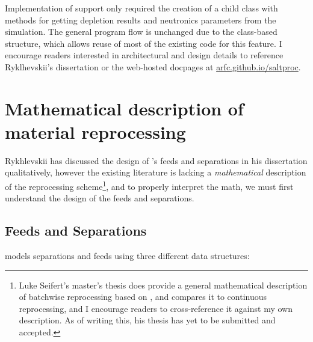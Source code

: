 Implementation of \OpenMC support only required the creation of a child class
with methods for getting depletion results and neutronics parameters from the
\OpenMC simulation. The general program flow is unchanged due to the
class-based structure, which allows reuse of most of the existing code for
this feature. I encourage readers interested in architectural and design
details to reference Ryklhevskii's dissertation \cite{rykhlevskii_fuel_2020}
or the web-hosted \SaltProc docpages at \url{arfc.github.io/saltproc}.


\section{Mathematical description of material reprocessing}
Rykhlevskii has discussed the design of \SaltProc's feeds and separations in
his dissertation qualitatively, however the existing \SaltProc literature is lacking a {\it mathematical} description of the reprocessing scheme\footnote{Luke Seifert's master's thesis does provide a general
mathematical description of batchwise reprocessing based on \SaltProc, and
compares it to continuous reprocessing, and I encourage readers to
cross-reference it against my own description. As of writing this, his thesis
has yet to be submitted and accepted.}, and to properly interpret the math, we
must first understand the design of the feeds and separations.

\subsection{Feeds and Separations}
\label{sub:feeds-separations}
\SaltProc models separations and feeds using three different data structures:

